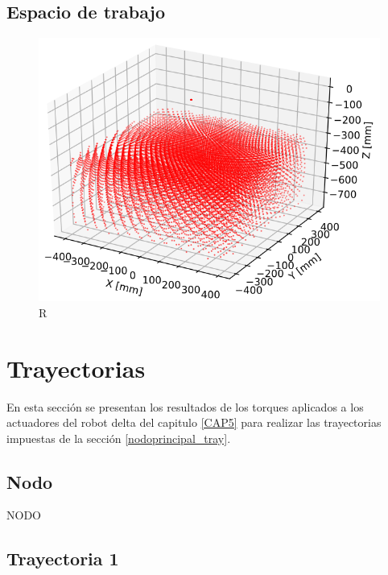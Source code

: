     \subsection{Espacio de trabajo}
        \begin{figure}[h]
            \centering
            \includegraphics[width=1.0\linewidth]{Main/Chapter7/Images7/ws_6.png}
            \caption{R}
            \label{f:cap7_ws6}
        \end{figure}  

        
        
        
        
\newpage


\section{Trayectorias}
    En esta sección se presentan los resultados de los torques aplicados a los actuadores del robot delta del capitulo \ref{CAP5} para realizar las trayectorias impuestas de la sección \ref{nodoprincipal_tray}.

    \subsection{Nodo}
    NODO 

    \subsection{Trayectoria 1}
    
